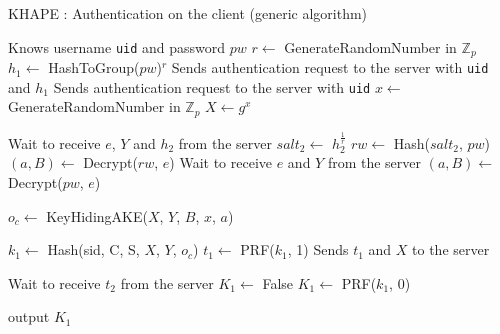 \documentclass[../report.tex]{subfiles}
\begin{document}
\begin{algorithm}[h]
\caption{KHAPE : Authentication on the client (generic algorithm)}
\label{alg:login_client}
\begin{algorithmic}
\Require Knows username \verb|uid| and password $pw$
    \State $r \gets$ GenerateRandomNumber in $\mathbb{Z}_p$
    \State $h_1 \gets$ HashToGroup($pw$)$^r$
    \State Sends authentication request to the server with \verb|uid| and $h_1$
\Else
    \State Sends authentication request to the server with \verb|uid|
\EndIf
\State $x \gets$ GenerateRandomNumber in $\mathbb{Z}_p$
\State $X \gets g^x$

    \State Wait to receive $e$, $Y$ and $h_2$ from the server
    \State $salt_2 \gets$ $h_2^{\frac{1}{r}}$
    \State $rw \gets$ Hash($salt_2$, $pw$)
    \State $(a, B) \gets$ Decrypt($rw$, $e$)
\Else
    \State Wait to receive $e$ and $Y$ from the server
    \State $(a, B) \gets$ Decrypt($pw$, $e$)
\EndIf



\State $o_c \gets$ KeyHidingAKE($X$, $Y$, $B$, $x$, $a$)

\State $k_1 \gets$ Hash(sid, C, S, $X$, $Y$, $o_c$)
\State $t_1 \gets$ PRF($k_1$, 1)
\State Sends $t_1$ and $X$ to the server


\State Wait to receive $t_2$ from the server
    \State $K_1 \gets$ False
\Else
    \State $K_1 \gets$ PRF($k_1$, 0)
\EndIf

\State output $K_1$
\end{algorithmic}
\end{algorithm}
\end{document}
